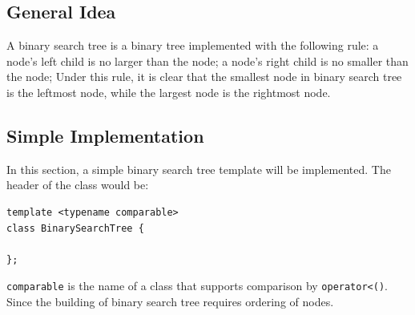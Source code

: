 \documentclass[11pt]{book}
\begin{document}
\subsection{General Idea}
\label{sec:orga4e00f1}
A binary search tree is a binary tree implemented with the following rule: a node's left child is no larger than the node; a node's right child is no smaller than the node; Under this rule, it is clear that the smallest node in binary search tree is the leftmost node, while the largest node is the rightmost node.
\subsection{Simple Implementation}
\label{sec:org6cde362}
In this section, a simple binary search tree template will be implemented. The header of the class would be:
\begin{verbatim}
template <typename comparable>
class BinarySearchTree {

};
\end{verbatim}
\texttt{comparable} is the name of a class that supports comparison by \texttt{operator<()}. Since the building of binary search tree requires ordering of nodes.
\end{document}
